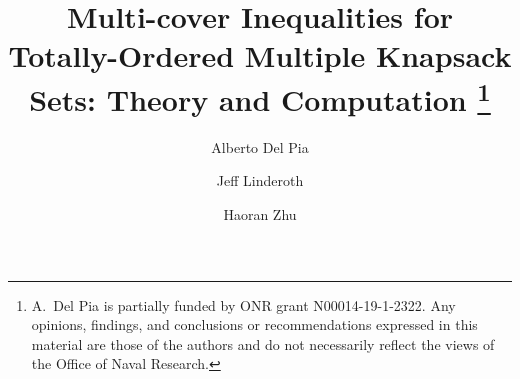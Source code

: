 \newcommand{\R}{\mathbb{R}}
\newcommand{\N}{\mathbb{N}}
\newcommand{\Z}{\mathbb{Z}}
\newcommand{\Q}{\mathbb{Q}}
\newcommand{\proj}{\operatorname{proj}}
\newcommand{\ext}{\operatorname{ext}}
\newcommand{\cl}{\operatorname{cl}}
\newcommand{\conv}{\operatorname{conv}}
\newcommand{\cone}{\operatorname{cone}}
\newcommand{\fr}{\operatorname{fr}}
\newcommand{\pos}{\operatorname{pos}}
\newcommand{\ray}{\operatorname{ray}}
\newcommand{\rec}{\operatorname{rec}}
\newcommand{\supp}{\operatorname{supp}}
\newcommand{\inter}{\operatorname{int}}
\newcommand{\aff}{\operatorname{aff}}
\newcommand{\spa}{\operatorname{span}}
\newcommand{\lin}{\operatorname{lin}}
\newcommand{\st}{\text{s.t.}}
\newcommand{\eg}{\text{e.g.}}
\newcommand{\etc}{\text{e.t.c.}}
\newcommand{\CG}{\text{CG}}
\newcommand{\I}{\mathscr{I}}
\newcommand{\F}{\mathscr{F}}
\newcommand{\D}{\mathscr{D}}
\newcommand{\knap}{K_{\mbox{\scriptsize \sc knap}}}
\newcommand{\C}{\mathscr{C}}
\newcommand{\dominates}{\triangleright}
\newcommand{\cA}{\mathcal{A}}
\renewcommand{\S}{\mathscr{S}}

\newtheorem{observation}{Observation}


\newenvironment{cpf}
{\begin{trivlist} \item[] {\em Proof of claim }}
{$\hfill\diamond$ \end{trivlist}}








\title{Multi-cover Inequalities for Totally-Ordered Multiple Knapsack Sets: Theory and Computation
\thanks{A.~Del Pia is partially funded by ONR grant N00014-19-1-2322. Any opinions, findings, and conclusions or recommendations expressed in this material are those of the authors and do not necessarily reflect the views of the Office of Naval Research.}%
}


\author{Alberto Del Pia \and Jeff Linderoth \and Haoran Zhu
}




